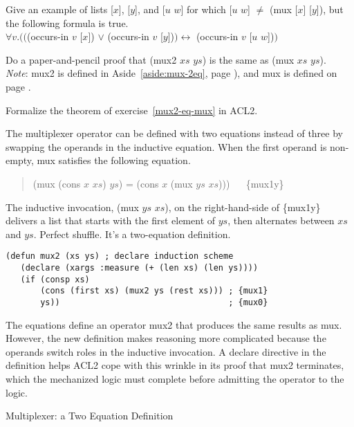 \begin{ExerciseList}
\Exercise\label{mux-val-len-not-enough}
Give an example of lists \textsf{[$x$]}, \textsf{[$y$]}, and \textsf{[$u$ $w$]} for which
\textsf{[$u$ $w$]} $\neq$ \textsf{(mux [$x$] [$y$])}, but the following formula is true.\\
\hspace*{1cm}$\forall v.(($\textsf{(occurs-in $v$ [$x$])} $\vee$ \textsf{(occurs-in $v$ [$y$])}$)
\leftrightarrow$ \textsf{(occurs-in $v$ [$u$ $w$])}$)$

\Exercise\label{mux2-eq-mux}
Do a paper-and-pencil proof that
\textsf{(mux2 $xs$ $ys$)} is the same as \textsf{(mux $xs$ $ys$)}.\\
\emph{Note}: \textsf{mux2} is defined in
Aside~\ref{aside:mux-2eq}, page \pageref{aside:mux-2eq}),
and \textsf{mux} is defined on page \pageref{mux-defun}.

\Exercise
Formalize the theorem of exercise~\ref{mux2-eq-mux} in ACL2.

\end{ExerciseList}

\begin{aside}
The multiplexer operator can be defined with two equations instead of three
by swapping the operands in the inductive equation.
When the first operand is non-empty, \textsf{mux} satisfies the following equation.
\begin{quote}
\textsf{(mux (cons $x$ $xs$) $ys$) = (cons $x$ (mux $ys$ $xs$)))} ~~ \{mux1y\}
\end{quote}

The inductive invocation, \textsf{(mux $ys$ $xs$)},
on the right-hand-side of \{mux1y\}
delivers a list that starts with the first element of $ys$,
then alternates between $xs$ and $ys$.
Perfect shuffle.
It's a two-equation definition.

\label{mux-2eq-defun}
\begin{Verbatim}
(defun mux2 (xs ys) ; declare induction scheme
   (declare (xargs :measure (+ (len xs) (len ys))))
   (if (consp xs)
       (cons (first xs) (mux2 ys (rest xs))) ; {mux1}
       ys))                                  ; {mux0}
\end{Verbatim}

The equations define an operator \textsf{mux2} that produces
the same results as \textsf{mux}.
However, the new definition makes reasoning more complicated
because the operands switch roles in the inductive invocation.
A \textsf{declare} directive in the definition
helps ACL2 cope with this wrinkle in its
proof that \textsf{mux2} terminates,
which the mechanized logic must complete before
admitting the operator to the logic.
\caption{Multiplexer: a Two Equation Definition}
\label{aside:mux-2eq}
\end{aside}

